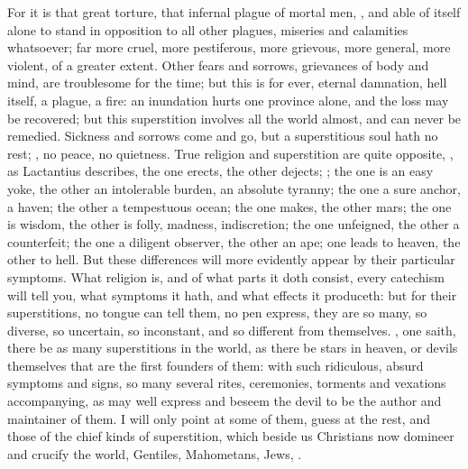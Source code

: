 {For it is that great torture, that infernal plague of mortal men,
, and able of itself alone to
stand in opposition to all other plagues, miseries and calamities
whatsoever; far more cruel, more pestiferous, more grievous, more
general, more violent, of a greater extent. Other fears and sorrows,
grievances of body and mind, are troublesome for the time; but this is
for ever, eternal damnation, hell itself, a plague, a fire: an
inundation hurts one province alone, and the loss may be recovered; but
this superstition involves all the world almost, and can never be
remedied. Sickness and sorrows come and go, but a superstitious soul
hath no rest; , no peace, no quietness. True religion and superstition are
quite opposite, , as Lactantius
describes, the one erects, the other dejects; ; the one is an easy yoke, the other an intolerable burden, an
absolute tyranny; the one a sure anchor, a haven; the other a
tempestuous ocean; the one makes, the other mars; the one is wisdom,
the other is folly, madness, indiscretion; the one unfeigned, the other
a counterfeit; the one a diligent observer, the other an ape; one leads
to heaven, the other to hell. But these differences will more evidently
appear by their particular symptoms. What religion is, and of what
parts it doth consist, every catechism will tell you, what symptoms it
hath, and what effects it produceth: but for their superstitions, no
tongue can tell them, no pen express, they are so many, so diverse, so
uncertain, so inconstant, and so different from themselves. , one saith, there be as many
superstitions in the world, as there be stars in heaven, or devils
themselves that are the first founders of them: with such ridiculous,
absurd symptoms and signs, so many several rites, ceremonies, torments
and vexations accompanying, as may well express and beseem the devil to
be the author and maintainer of them. I will only point at some of
them,  guess at the rest, and those of the chief kinds
of superstition, which beside us Christians now domineer and crucify
the world, Gentiles, Mahometans, Jews, \etc{}.

}
